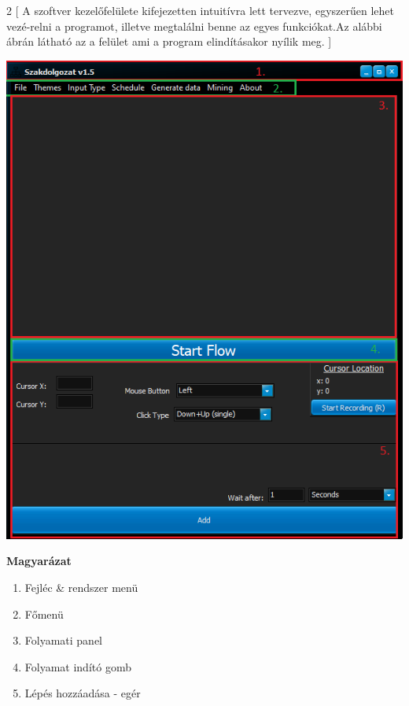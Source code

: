 
\begin{multicols}{2}
[
 A szoftver kezelőfelülete kifejezetten intuitívra lett tervezve, egyszerűen lehet vezé\hyp{}relni a programot, illetve megtalálni benne az egyes funkciókat.Az alábbi ábrán látható az a felület ami a program elindításakor nyílik meg.
]
	
	\begin{Figure}
		\centering
		\includegraphics[width=\linewidth, keepaspectratio=true]{images/img_ui_1}	
		\label{fig:ui}
	\end{Figure}
	
	\textbf{Magyarázat}
	\begin{enumerate}
		\item{Fejléc \& rendszer menü}
		\item{Főmenü}
		\item{Folyamati panel}
		\item{Folyamat indító gomb}
		\item{Lépés hozzáadása - egér}
	\end{enumerate}

\end{multicols}

